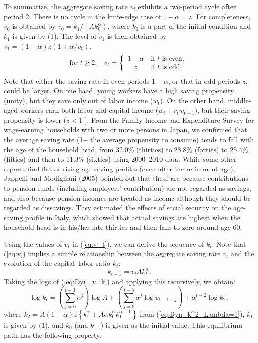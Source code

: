 \documentclass{MBE}%
\begin{document}
{To summarize, the aggregate saving rate $v_{t}$ exhibits a two-period cycle after period 2: {There
is no cycle in the knife-edge case of $1-\alpha=z$. For completeness, $v_{0}$ is obtained by
$v_{0}= k_{1}/\left( Ak_{0}^{\alpha}\right)  $, where $k_{0}$ is a part of the initial condition
and $k_{1}$ is given by (1). The level of $v_{1}$ is
then obtained by $v_{1}=\left(  1-\alpha\right)  z \left(  1+{\alpha}/{v_{0}%
}\right)  .$ \label{foot:v}}
\begin{equation}
\text{for $t\geq2$,}\quad v_{t}=\left\{
\begin{array}
[c]{cl}%
1-\alpha & \text{if $t$ is even},\\
z & \text{if $t$ is odd}.
\end{array}
\right.  \label{eq:v_t}%
\end{equation}
Note that either the saving rate in even periods $1-\alpha$, or that in odd
periods $z$, could be larger. On one hand, young workers have a high saving
propensity (unity), but they save only out of labor income ($w_{t}$). On the
other hand, middle-aged workers earn both labor and capital income
($w_{t}+r_{t}w_{t-1}$), but their saving propensity is lower ($z<1$%
). {From the Family Income and Expenditure Survey for wage-earning households with two or more
persons in Japan, we confirmed that the average saving rate (1$-$ the average propensity to
consume) tends to fall with the age of the household head, from 32.0\% (thirties) to 28.8\%
(forties) to 25.4\% (fifties) and then to 11.3\% (sixties) using 2000--2010 data. While some other
reports find flat or rising age-saving profiles (even after the retirement age), Jappelli and
Modigliani (2005) pointed out that these are because contributions to pension funds (including
employers' contribution) are not regarded as savings, and also because pension incomes are treated
as income although they should be regarded as dissavings. They estimated the effects of social
security on the age-saving profile in Italy, which showed that actual savings are highest when the
household head is in his/her late thirties and then falls to zero around age 60.}

Using the values of $v_{t}$ in (\ref{eq:v_t}), we can derive the sequence of
$k_{t}$. Note that (\ref{eq:v}) implies a simple relationship between the
aggregate saving rate $v_{t}$ and the evolution of the capital--labor ratio
$k_{t}$:
\begin{equation}
k_{t+1}=v_{t}Ak_{t}^{\alpha}. \label{eq:Dyn_v_k}%
\end{equation}
Taking the logs of (\ref{eq:Dyn_v_k}) and applying this recursively, we
obtain:
\begin{equation}
\log k_{t}=\left(  \sum_{j=0}^{t-3}\alpha^{j}\right)  \log A+\left(
\sum_{j=0}^{t-3}\alpha^{j}\log v_{t-1-j}\right)  +\alpha^{t-2}\log k_{2}, \label{eq:ksequence}%
\end{equation}
where $k_{2}=A(1-\alpha)z\left\{  k_{1}^{\alpha}+A\alpha k_{0}^{\alpha}%
k_{1}^{\alpha-1}\right\}  $ from (\ref{eq:Dyn_k^2_Lambda=1}), $k_{1}$ is given by (1), and $k_{0}$
(and $k_{-1}$) is given as the initial value. This equilibrium path has the following property.

}
\end{document}
